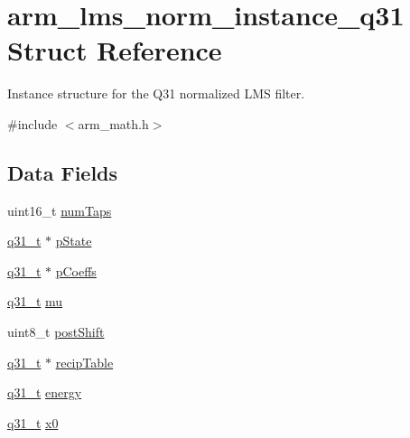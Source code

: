 \hypertarget{structarm__lms__norm__instance__q31}{}\section{arm\+\_\+lms\+\_\+norm\+\_\+instance\+\_\+q31 Struct Reference}
\label{structarm__lms__norm__instance__q31}


Instance structure for the Q31 normalized L\+MS filter.  




{\ttfamily \#include $<$arm\+\_\+math.\+h$>$}

\subsection*{Data Fields}
\begin{DoxyCompactItemize}
\item 
uint16\+\_\+t \hyperlink{structarm__lms__norm__instance__q31_a751941891e47f522a7f5375fe8990aac}{num\+Taps}
\item 
\hyperlink{arm__math_8h_adc89a3547f5324b7b3b95adec3806bc0}{q31\+\_\+t} $\ast$ \hyperlink{structarm__lms__norm__instance__q31_adee4ba3ee8869865af7d8fa08ca913d6}{p\+State}
\item 
\hyperlink{arm__math_8h_adc89a3547f5324b7b3b95adec3806bc0}{q31\+\_\+t} $\ast$ \hyperlink{structarm__lms__norm__instance__q31_a68888e36167d81cb7836db10367a1682}{p\+Coeffs}
\item 
\hyperlink{arm__math_8h_adc89a3547f5324b7b3b95adec3806bc0}{q31\+\_\+t} \hyperlink{structarm__lms__norm__instance__q31_a21ab4237a726ea7751f5026d89d2e577}{mu}
\item 
uint8\+\_\+t \hyperlink{structarm__lms__norm__instance__q31_a74050e9f36542bd56f4052381a82ae8f}{post\+Shift}
\item 
\hyperlink{arm__math_8h_adc89a3547f5324b7b3b95adec3806bc0}{q31\+\_\+t} $\ast$ \hyperlink{structarm__lms__norm__instance__q31_aec8a88dd688519b6b1e3c8d2e24bb775}{recip\+Table}
\item 
\hyperlink{arm__math_8h_adc89a3547f5324b7b3b95adec3806bc0}{q31\+\_\+t} \hyperlink{structarm__lms__norm__instance__q31_a012fee0f71095d2557bb633e73ef7355}{energy}
\item 
\hyperlink{arm__math_8h_adc89a3547f5324b7b3b95adec3806bc0}{q31\+\_\+t} \hyperlink{structarm__lms__norm__instance__q31_a973b8350a0c7b113a5f002bc0b86bf76}{x0}
\end{DoxyCompactItemize}


